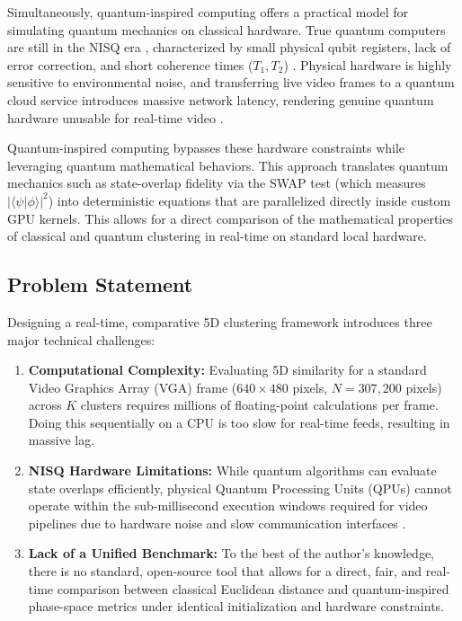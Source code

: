 Simultaneously, quantum-inspired computing offers a practical model for simulating quantum mechanics on classical hardware. True quantum computers are still in the NISQ era \cite{preskill2018quantum}, characterized by small physical qubit registers, lack of error correction, and short coherence times ($T_1, T_2$) \cite{bharti2022noisy}. Physical hardware is highly sensitive to environmental noise, and transferring live video frames to a quantum cloud service introduces massive network latency, rendering genuine quantum hardware unusable for real-time video \cite{fraunhofer2025quantum}.

Quantum-inspired computing bypasses these hardware constraints while leveraging quantum mathematical behaviors. This approach translates quantum mechanics such as state-overlap fidelity via the SWAP test \cite{buhrman2001quantum} (which measures $|\langle\psi\vert\phi\rangle|^2$) into deterministic equations that are parallelized directly inside custom GPU kernels. This allows for a direct comparison of the mathematical properties of classical and quantum clustering in real-time on standard local hardware.

\subsection{Problem Statement}
Designing a real-time, comparative 5D clustering framework introduces three major technical challenges:
\begin{enumerate}
    \item \textbf{Computational Complexity:} Evaluating 5D similarity for a standard Video Graphics Array (VGA) frame ($640 \times 480$ pixels, $N = 307,200$ pixels) across $K$ clusters requires millions of floating-point calculations per frame. Doing this sequentially on a CPU is too slow for real-time feeds, resulting in massive lag.
    \item \textbf{NISQ Hardware Limitations:} While quantum algorithms can evaluate state overlaps efficiently, physical Quantum Processing Units (QPUs) cannot operate within the sub-millisecond execution windows required for video pipelines due to hardware noise \cite{bharti2022noisy} and slow communication interfaces \cite{fraunhofer2025quantum}.
    \item \textbf{Lack of a Unified Benchmark:} To the best of the author's knowledge, there is no standard, open-source tool that allows for a direct, fair, and real-time comparison between classical Euclidean distance \cite{lloyd1982least} and quantum-inspired phase-space metrics under identical initialization and hardware constraints.
\end{enumerate}

